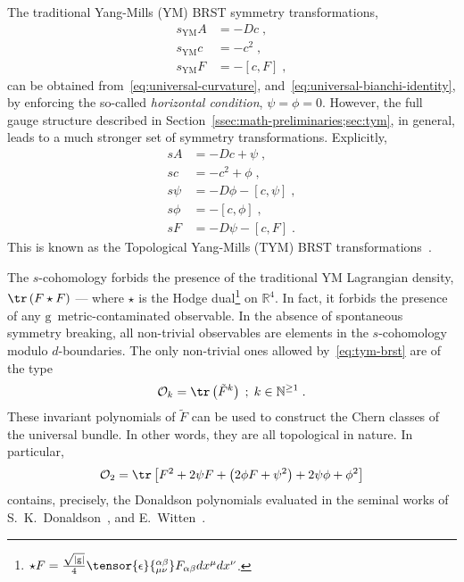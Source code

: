 \documentclass[../main/tex]{subfiles}
\begin{document}
The traditional Yang-Mills (YM) BRST symmetry transformations,
\begin{subequations}\label{eq:ym-brst}
  \begin{align}
    s_{\text{YM}}A & = -Dc \;,                   \\
    s_{\text{YM}}c & = - c^2 \;,                 \\
    s_{\text{YM}}F & = - \left[ c, F \right] \;,
  \end{align}
\end{subequations}
can be obtained from~\eqref{eq:universal-curvature}, and~\eqref{eq:universal-bianchi-identity}, by enforcing the so-called \emph{horizontal condition}, $\psi=\phi=0$. However, the full gauge structure described in Section~\ref{ssec:math-preliminaries;sec:tym}, in general, leads to a much stronger set of symmetry transformations. Explicitly,
\begin{subequations}\label{eq:tym-brst}
  \begin{align}
    sA    & = -Dc + \psi \;,                      \\
    sc    & = - c^2 + \phi \;,                    \\
    s\psi & = -D\phi - \left[ c, \psi \right] \;, \\
    s\phi & = - \left[ c, \phi \right]\;,         \\
    sF    & = -D\psi - \left[ c, F \right] \;.
  \end{align}
\end{subequations}
This is known as the Topological Yang-Mills (TYM) BRST transformations~\cite{baulieu1988a}.

The $ s $-cohomology forbids the presence of the traditional YM Lagrangian density, $ \tr \left( F \star F \right) $ --- where $ \star $ is the Hodge dual\footnote{ $ \star F = \frac{ \sqrt{ |\mathrm{g}| } }{ 4 } \tensor{ \epsilon }{ _{\mu \nu}^{\alpha \beta} } F_{\alpha \beta} dx^\mu dx^\nu $. } on $ \mathbb{R}^4 $. In fact, it forbids the presence of any $ \mathrm{g} $~metric-contaminated observable. In the absence of spontaneous symmetry breaking, all non-trivial observables are elements in the $s$-cohomology modulo $d$-boundaries. The only non-trivial ones allowed by~\eqref{eq:tym-brst} are of the type
\begin{equation}\label{eq:tym-observables}
  \mathcal{O}_k = \tr \left( \tilde{F}^k \right) \; ; \; k \in {\mathbb{N}}^{\ge 1} \;.
\end{equation}
These invariant polynomials of $\tilde{F}$ can be used to construct the Chern classes of the universal bundle. In other words, they are all topological in nature. In particular,
\begin{equation}\label{eq:donaldson-polynomials}
  \mathcal{O}_2 = \tr \left[ F^2 + 2\psi F + \left( 2\phi F + \psi^2 \right) + 2\psi \phi + \phi^2\right]
\end{equation}
contains, precisely, the Donaldson polynomials evaluated in the seminal works of S.~K.~Donaldson~\cite{donaldson1983a,donaldson1990a}, and E.~Witten~\cite{witten1988d}.
\end{document}
